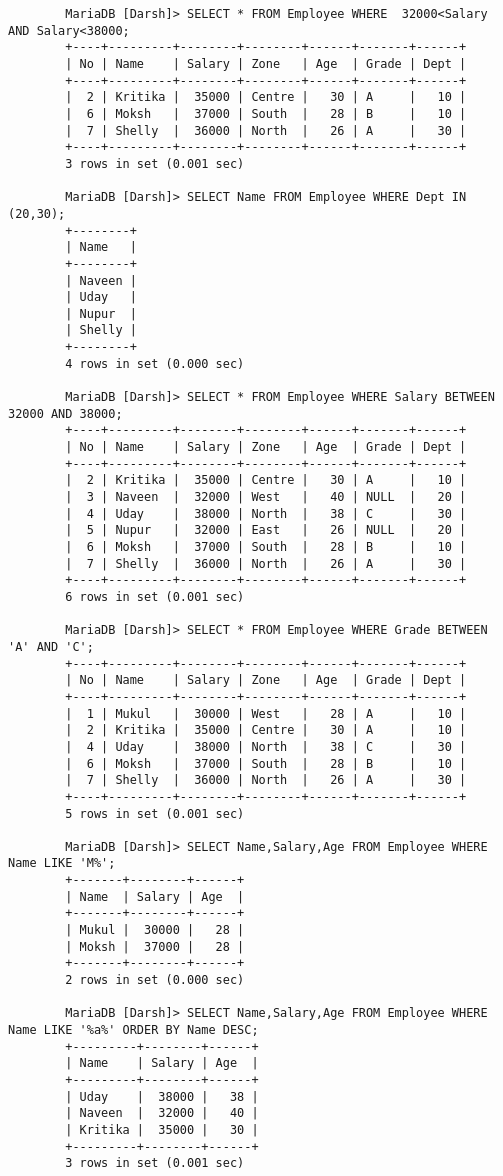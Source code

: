 \documentclass[
a4paper]{article}
\begin{document}
\begin{lstlisting}
		MariaDB [Darsh]> SELECT * FROM Employee WHERE  32000<Salary AND Salary<38000;
		+----+---------+--------+--------+------+-------+------+
		| No | Name    | Salary | Zone   | Age  | Grade | Dept |
		+----+---------+--------+--------+------+-------+------+
		|  2 | Kritika |  35000 | Centre |   30 | A     |   10 |
		|  6 | Moksh   |  37000 | South  |   28 | B     |   10 |
		|  7 | Shelly  |  36000 | North  |   26 | A     |   30 |
		+----+---------+--------+--------+------+-------+------+
		3 rows in set (0.001 sec)
		
		MariaDB [Darsh]> SELECT Name FROM Employee WHERE Dept IN (20,30);
		+--------+
		| Name   |
		+--------+
		| Naveen |
		| Uday   |
		| Nupur  |
		| Shelly |
		+--------+
		4 rows in set (0.000 sec)
		
		MariaDB [Darsh]> SELECT * FROM Employee WHERE Salary BETWEEN 32000 AND 38000;
		+----+---------+--------+--------+------+-------+------+
		| No | Name    | Salary | Zone   | Age  | Grade | Dept |
		+----+---------+--------+--------+------+-------+------+
		|  2 | Kritika |  35000 | Centre |   30 | A     |   10 |
		|  3 | Naveen  |  32000 | West   |   40 | NULL  |   20 |
		|  4 | Uday    |  38000 | North  |   38 | C     |   30 |
		|  5 | Nupur   |  32000 | East   |   26 | NULL  |   20 |
		|  6 | Moksh   |  37000 | South  |   28 | B     |   10 |
		|  7 | Shelly  |  36000 | North  |   26 | A     |   30 |
		+----+---------+--------+--------+------+-------+------+
		6 rows in set (0.001 sec)
		
		MariaDB [Darsh]> SELECT * FROM Employee WHERE Grade BETWEEN 'A' AND 'C';
		+----+---------+--------+--------+------+-------+------+
		| No | Name    | Salary | Zone   | Age  | Grade | Dept |
		+----+---------+--------+--------+------+-------+------+
		|  1 | Mukul   |  30000 | West   |   28 | A     |   10 |
		|  2 | Kritika |  35000 | Centre |   30 | A     |   10 |
		|  4 | Uday    |  38000 | North  |   38 | C     |   30 |
		|  6 | Moksh   |  37000 | South  |   28 | B     |   10 |
		|  7 | Shelly  |  36000 | North  |   26 | A     |   30 |
		+----+---------+--------+--------+------+-------+------+
		5 rows in set (0.001 sec)
		
		MariaDB [Darsh]> SELECT Name,Salary,Age FROM Employee WHERE Name LIKE 'M%';
		+-------+--------+------+
		| Name  | Salary | Age  |
		+-------+--------+------+
		| Mukul |  30000 |   28 |
		| Moksh |  37000 |   28 |
		+-------+--------+------+
		2 rows in set (0.000 sec)
		
		MariaDB [Darsh]> SELECT Name,Salary,Age FROM Employee WHERE Name LIKE '%a%' ORDER BY Name DESC;
		+---------+--------+------+
		| Name    | Salary | Age  |
		+---------+--------+------+
		| Uday    |  38000 |   38 |
		| Naveen  |  32000 |   40 |
		| Kritika |  35000 |   30 |
		+---------+--------+------+
		3 rows in set (0.001 sec)
		

\end{lstlisting}
\end{document}
